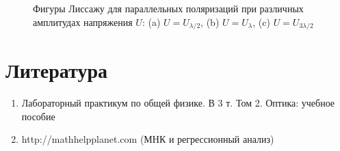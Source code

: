 \documentclass[a4paper, 12pt]{article}%
\begin{document}
\begin{figure}[h]
\begin{minipage}[h]{0.3\linewidth}
		\end{minipage}
		\caption{Фигуры Лиссажу для параллельных поляризаций при различных амплитудах напряжения $U$: (a) $U = U_{\lambda/2}$, (b) $U = U_{\lambda}$, (c) $U = U_{3\lambda/2}$ }
		\label{lis}
	\end{figure}


\section{Литература}

\begin{enumerate}

\item Лабораторный практикум по общей физике. В 3 т. Том 2. Оптика: учебное пособие

\item http://mathhelpplanet.com (МНК и регрессионный анализ)

\end{enumerate}	
\end{document}
